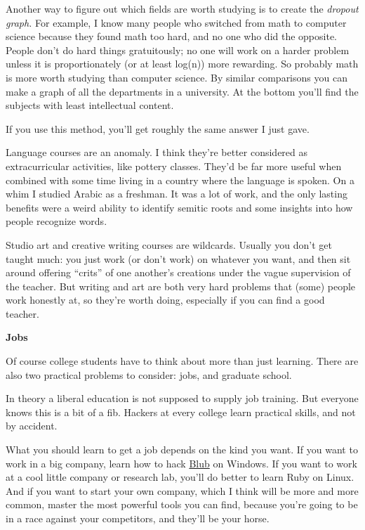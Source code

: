\documentclass[12pt]{book}
\begin{document}
Another way to figure out which fields are worth studying is to create
the \emph{dropout graph.} For example, I know many people who switched
from math to computer science because they found math too hard, and no
one who did the opposite. People don't do hard things gratuitously; no
one will work on a harder problem unless it is proportionately (or at
least log(n)) more rewarding. So probably math is more worth studying
than computer science. By similar comparisons you can make a graph of
all the departments in a university. At the bottom you'll find the
subjects with least intellectual content.

If you use this method, you'll get roughly the same answer I just gave.

Language courses are an anomaly. I think they're better considered as
extracurricular activities, like pottery classes. They'd be far more
useful when combined with some time living in a country where the
language is spoken. On a whim I studied Arabic as a freshman. It was a
lot of work, and the only lasting benefits were a weird ability to
identify semitic roots and some insights into how people recognize
words.

Studio art and creative writing courses are wildcards. Usually you don't
get taught much: you just work (or don't work) on whatever you want, and
then sit around offering ``crits'' of one another's creations under the
vague supervision of the teacher. But writing and art are both very hard
problems that (some) people work honestly at, so they're worth doing,
especially if you can find a good teacher.

\textbf{Jobs}

Of course college students have to think about more than just learning.
There are also two practical problems to consider: jobs, and graduate
school.

In theory a liberal education is not supposed to supply job training.
But everyone knows this is a bit of a fib. Hackers at every college
learn practical skills, and not by accident.

What you should learn to get a job depends on the kind you want. If you
want to work in a big company, learn how to hack \href{avg.html}{Blub}
on Windows. If you want to work at a cool little company or research
lab, you'll do better to learn Ruby on Linux. And if you want to start
your own company, which I think will be more and more common, master the
most powerful tools you can find, because you're going to be in a race
against your competitors, and they'll be your horse.
\end{document}
